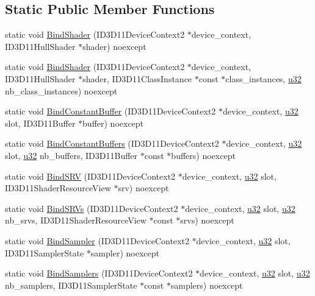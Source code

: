 \subsection*{Static Public Member Functions}
\begin{DoxyCompactItemize}
\item 
static void \hyperlink{structmage_1_1_pipeline_1_1_h_s_aeda172e8c7287a8aa34d96508a378e90}{Bind\+Shader} (I\+D3\+D11\+Device\+Context2 $\ast$device\+\_\+context, I\+D3\+D11\+Hull\+Shader $\ast$shader) noexcept
\item 
static void \hyperlink{structmage_1_1_pipeline_1_1_h_s_ad6c718213708d1e57b2b49ef9c99aaa2}{Bind\+Shader} (I\+D3\+D11\+Device\+Context2 $\ast$device\+\_\+context, I\+D3\+D11\+Hull\+Shader $\ast$shader, I\+D3\+D11\+Class\+Instance $\ast$const $\ast$class\+\_\+instances, \hyperlink{namespacemage_af2b398bf98eb10351f49cad73fe2cc73}{u32} nb\+\_\+class\+\_\+instances) noexcept
\item 
static void \hyperlink{structmage_1_1_pipeline_1_1_h_s_afa1d809b18e0c4b1e23f1158fe0ccbb2}{Bind\+Constant\+Buffer} (I\+D3\+D11\+Device\+Context2 $\ast$device\+\_\+context, \hyperlink{namespacemage_af2b398bf98eb10351f49cad73fe2cc73}{u32} slot, I\+D3\+D11\+Buffer $\ast$buffer) noexcept
\item 
static void \hyperlink{structmage_1_1_pipeline_1_1_h_s_a802b63d1ecda6a1cdd553b8bed89764d}{Bind\+Constant\+Buffers} (I\+D3\+D11\+Device\+Context2 $\ast$device\+\_\+context, \hyperlink{namespacemage_af2b398bf98eb10351f49cad73fe2cc73}{u32} slot, \hyperlink{namespacemage_af2b398bf98eb10351f49cad73fe2cc73}{u32} nb\+\_\+buffers, I\+D3\+D11\+Buffer $\ast$const $\ast$buffers) noexcept
\item 
static void \hyperlink{structmage_1_1_pipeline_1_1_h_s_a3bb84c57bb3d650d59226fd3911c735f}{Bind\+S\+RV} (I\+D3\+D11\+Device\+Context2 $\ast$device\+\_\+context, \hyperlink{namespacemage_af2b398bf98eb10351f49cad73fe2cc73}{u32} slot, I\+D3\+D11\+Shader\+Resource\+View $\ast$srv) noexcept
\item 
static void \hyperlink{structmage_1_1_pipeline_1_1_h_s_aa96f53e0d5a39cec4183685a262d5473}{Bind\+S\+R\+Vs} (I\+D3\+D11\+Device\+Context2 $\ast$device\+\_\+context, \hyperlink{namespacemage_af2b398bf98eb10351f49cad73fe2cc73}{u32} slot, \hyperlink{namespacemage_af2b398bf98eb10351f49cad73fe2cc73}{u32} nb\+\_\+srvs, I\+D3\+D11\+Shader\+Resource\+View $\ast$const $\ast$srvs) noexcept
\item 
static void \hyperlink{structmage_1_1_pipeline_1_1_h_s_a0f2f3ae7cddb194d3c1fc0085f76b4d7}{Bind\+Sampler} (I\+D3\+D11\+Device\+Context2 $\ast$device\+\_\+context, \hyperlink{namespacemage_af2b398bf98eb10351f49cad73fe2cc73}{u32} slot, I\+D3\+D11\+Sampler\+State $\ast$sampler) noexcept
\item 
static void \hyperlink{structmage_1_1_pipeline_1_1_h_s_a4b9989135a2211c8694cffed83cc4e1d}{Bind\+Samplers} (I\+D3\+D11\+Device\+Context2 $\ast$device\+\_\+context, \hyperlink{namespacemage_af2b398bf98eb10351f49cad73fe2cc73}{u32} slot, \hyperlink{namespacemage_af2b398bf98eb10351f49cad73fe2cc73}{u32} nb\+\_\+samplers, I\+D3\+D11\+Sampler\+State $\ast$const $\ast$samplers) noexcept
\end{DoxyCompactItemize}
